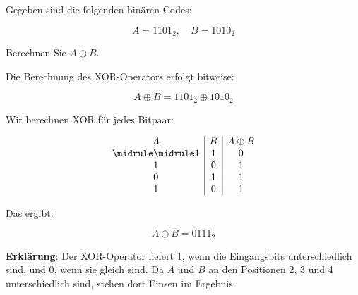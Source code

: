 \begin{myexercise}
Gegeben sind die folgenden binären Codes:

\[
A = 1101_2, \quad B = 1010_2
\]

Berechnen Sie \( A \oplus B \).

\begin{myanswer}
Die Berechnung des XOR-Operators erfolgt bitweise:

\[
A \oplus B = 1101_2 \oplus 1010_2
\]

Wir berechnen XOR für jedes Bitpaar:

\[
\begin{array}{c|c|c}
A & B & A \oplus B \\\midrule\midrule
1 & 1 & 0 \\
1 & 0 & 1 \\
0 & 1 & 1 \\
1 & 0 & 1 \\
\end{array}
\]

Das ergibt:

\[
A \oplus B = 0111_2
\]

\textbf{Erklärung}:  
Der XOR-Operator liefert 1, wenn die Eingangsbits unterschiedlich sind, und 0, wenn sie gleich sind. Da \( A \) und \( B \) an den Positionen 2, 3 und 4 unterschiedlich sind, stehen dort Einsen im Ergebnis.

\end{myanswer}
\end{myexercise}


